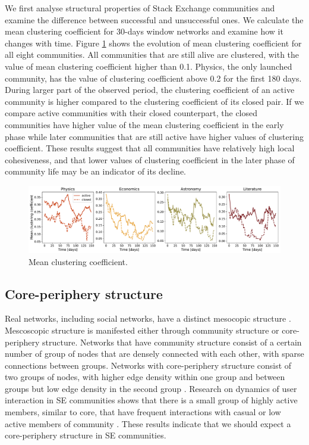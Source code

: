We first analyse structural properties of Stack Exchange communities and examine the difference between successful and unsuccessful ones. We calculate the mean clustering coefficient for 30-days window networks and examine how it changes with time. Figure \ref{fig:clustering} shows the evolution of mean clustering coefficient for all eight communities. All communities that are still alive are clustered, with the value of mean clustering coefficient higher than 0.1. Physics, the only launched community, has the value of clustering coefficient above 0.2 for the first 180 days.
During larger part of the observed period, the clustering coefficient of an active community is higher compared to the clustering coefficient of its closed pair. If we compare active communities with their closed counterpart, the closed communities have higher value of the mean clustering coefficient in the early phase while later communities that are still active have higher values of clustering coefficient. These results suggest that all communities have relatively high local cohesiveness, and that lower values of clustering coefficient in the later phase of community life may be an indicator of its decline. 

\begin{figure}
	\centering
	\includegraphics[width=\linewidth]{figures/stackexchange/clustering.pdf}%
	\caption{Mean clustering coefficient.}
	\label{fig:clustering}
\end{figure}

\subsection{Core-periphery structure}

Real networks, including social networks, have a distinct mesocopic structure \cite{fortunato2010community, gallagher2020clarified}. Mescoscopic structure is manifested either through community structure or core-periphery structure. Networks that have community structure consist of a certain number of group of nodes that are densely connected with each other, with sparse connections between groups. Networks with core-periphery structure consist of two groups of nodes, with higher edge density within one group and between groups but low edge density in the second group \cite{gallagher2020clarified}. Research on dynamics of user interaction in SE communities shows that there is a small group of highly active members, similar to core,  that have frequent interactions with casual or low active members of community \cite{santos2019activity, santos2019self}. These results indicate that we should expect a core-periphery structure in SE communities. 


